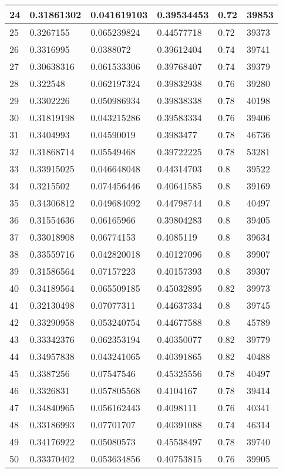 \begin{longtable}{|l|l|l|l|l|l|}
24 & 0.31861302 & 0.041619103 & 0.39534453 & 0.72 & 39853 \\ \hline 
25 & 0.3267155 & 0.065239824 & 0.44577718 & 0.72 & 39373 \\ \hline 
26 & 0.3316995 & 0.0388072 & 0.39612404 & 0.74 & 39741 \\ \hline 
27 & 0.30638316 & 0.061533306 & 0.39768407 & 0.74 & 39379 \\ \hline 
28 & 0.322548 & 0.062197324 & 0.39832938 & 0.76 & 39280 \\ \hline 
29 & 0.3302226 & 0.050986934 & 0.39838338 & 0.78 & 40198 \\ \hline 
30 & 0.31819198 & 0.043215286 & 0.39583334 & 0.76 & 39406 \\ \hline 
31 & 0.3404993 & 0.04590019 & 0.3983477 & 0.78 & 46736 \\ \hline 
32 & 0.31868714 & 0.05549468 & 0.39722225 & 0.78 & 53281 \\ \hline 
33 & 0.33915025 & 0.046648048 & 0.44314703 & 0.8 & 39522 \\ \hline 
34 & 0.3215502 & 0.074456446 & 0.40641585 & 0.8 & 39169 \\ \hline 
35 & 0.34306812 & 0.049684092 & 0.44798744 & 0.8 & 40497 \\ \hline 
36 & 0.31554636 & 0.06165966 & 0.39804283 & 0.8 & 39405 \\ \hline 
37 & 0.33018908 & 0.06774153 & 0.4085119 & 0.8 & 39634 \\ \hline 
38 & 0.33559716 & 0.042820018 & 0.40127096 & 0.8 & 39907 \\ \hline 
39 & 0.31586564 & 0.07157223 & 0.40157393 & 0.8 & 39307 \\ \hline 
40 & 0.34189564 & 0.065509185 & 0.45032895 & 0.82 & 39973 \\ \hline 
41 & 0.32130498 & 0.07077311 & 0.44637334 & 0.8 & 39745 \\ \hline 
42 & 0.33290958 & 0.053240754 & 0.44677588 & 0.8 & 45789 \\ \hline 
43 & 0.33342376 & 0.062353194 & 0.40350077 & 0.82 & 39779 \\ \hline 
44 & 0.34957838 & 0.043241065 & 0.40391865 & 0.82 & 40488 \\ \hline 
45 & 0.3387256 & 0.07547546 & 0.45325556 & 0.78 & 40497 \\ \hline 
46 & 0.3326831 & 0.057805568 & 0.4104167 & 0.78 & 39414 \\ \hline 
47 & 0.34840965 & 0.056162443 & 0.4098111 & 0.76 & 40341 \\ \hline 
48 & 0.33186993 & 0.07701707 & 0.40391088 & 0.74 & 46314 \\ \hline 
49 & 0.34176922 & 0.05080573 & 0.45538497 & 0.78 & 39740 \\ \hline 
50 & 0.33370402 & 0.053634856 & 0.40753815 & 0.76 & 39905 \\ \hline 
\end{longtable}